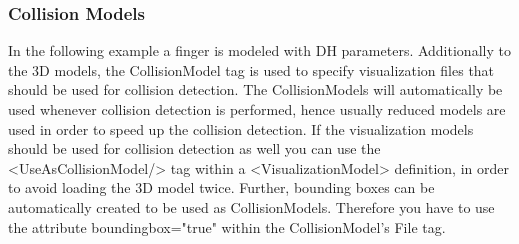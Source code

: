 \subsubsection*{Collision Models}
\par
In the following example a finger is modeled with DH parameters. Additionally to the 3D models, the CollisionModel tag is used to specify visualization files that should be used for collision detection. The CollisionModels will automatically be used whenever collision detection is performed, hence usually reduced models are used in order to speed up the collision detection. If the visualization models should be used for collision detection as well you can use the <UseAsCollisionModel/> tag within a <VisualizationModel> definition, in order to avoid loading the 3D model twice. Further, bounding boxes can be automatically created to be used as CollisionModels. Therefore you have to use the attribute boundingbox="true" within the CollisionModel's File tag. 
\par
